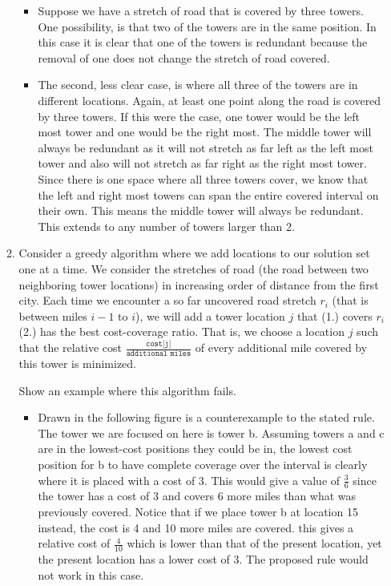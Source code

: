 \documentclass[11pt]{article}
\begin{document}
\begin{enumerate}
\begin{enumerate}
    \begin{itemize}
        \color{teal}
        \item Suppose we have a stretch of road that is covered by three towers.
            One possibility, is that two of the towers are in the same 
            position. In this case it is clear that one of the towers is 
            redundant because the removal of one does not change the stretch
            of road covered. 
        \item The second, less clear case, is where all three of the towers are
            in different locations. Again, at least one point along the road
            is covered by three towers. If this were the case, one tower would
            be the left most tower and one would be the right most. The middle 
            tower will always be redundant as it will not stretch as far left 
            as the left most tower and also will not stretch as far right as the
            right most tower. Since there is one space where all three towers 
            cover, we know that the left and right most towers can span the 
            entire covered interval on their own. This means the middle tower 
            will always be redundant. This extends to any number of towers 
            larger than 2.
    \end{itemize}

    \newpage
 \item Consider a greedy algorithm where we add locations to our solution set one at a time. We consider the stretches of road (the road between two neighboring tower locations) in increasing order of distance from the first city. Each time we encounter a so far uncovered road stretch $r_i$ (that is between miles $i-1$ to $i$), we will add a tower location $j$  that (1.) covers $r_i$ (2.) has the best cost-coverage ratio. That is, we choose a location $j$ such that the relative cost $\frac{\texttt{cost[j]}}{\texttt{additional\ miles}}$ of every additional mile covered by this tower is minimized. 
     
 Show an example where this algorithm fails. 

     \begin{itemize}
         \color{teal}
     \item Drawn in the following figure is a counterexample to the stated 
         rule. The tower we are focused on here is tower b. Assuming towers 
         a and c are in the lowest-cost positions they could be in, the lowest
         cost position for b to have complete coverage over the interval is 
         clearly where it is placed with a cost of 3. This would give a value 
         of $\frac{3}{6}$ since the tower has a cost of 3 and covers 6 more 
         miles than what was previously covered. Notice that if we place tower 
         b at location 15 instead, the cost is 4 and 10 more miles are covered.
         this gives a relative cost of $\frac{4}{10}$ which is lower than 
         that of the present location, yet the present location has a lower 
         cost of 3. The proposed rule would not work in this case.


\end{itemize}
\end{enumerate}
\end{enumerate}
\end{document}
